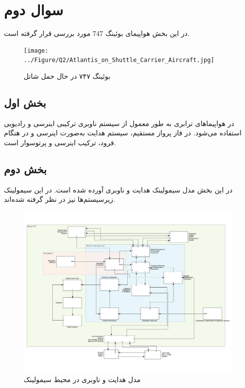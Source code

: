 \section{سوال دوم}
در این بخش هواپیمای بوئینگ 747 مورد بررسی قرار گرفته است.
 \begin{figure}[H]
	\centering
	\texttt{[image: ../Figure/Q2/Atlantis\_on\_Shuttle\_Carrier\_Aircraft.jpg]}
	\caption{بوئینگ ۷۴۷ در حال حمل شاتل
	}
\end{figure}
\subsection{بخش اول}
در هواپیماهای ترابری به طور معمول از سیستم ناوبری ترکیبی اینرسی و رادیویی استفاده می‌شود. در فاز پرواز مستقیم، سیستم هدایت به‌صورت اینرسی و در هنگام فرود، ترکیب اینرسی و پرتوسوار است.

\subsection{بخش دوم}
در این بخش مدل سیمولینک هدایت و ناوبری آورده شده است. در این سیمولینک زیرسیستم‌ها نیز در نظر گرفته شده‌اند.
 \begin{figure}[H]
	\centering
	\includegraphics[width=\linewidth]{../Figure/Q2/Q2_simulink.pdf}
	\caption{مدل هدایت و ناوبری در محیط سیمولینک
	}
\end{figure}

